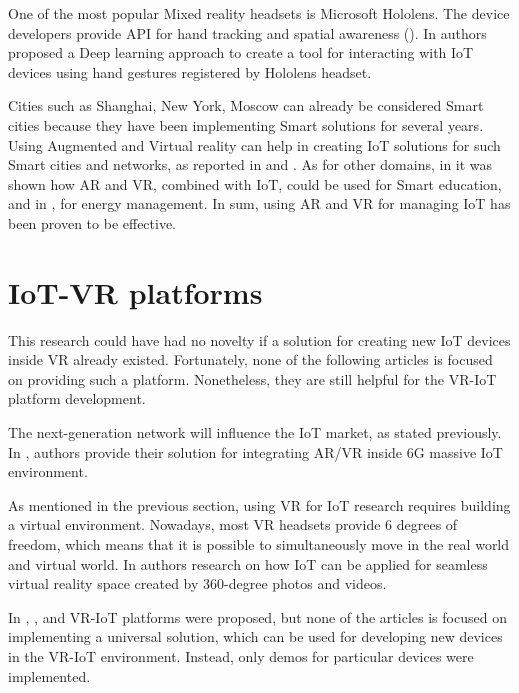 One of the most popular Mixed reality headsets is Microsoft Hololens. The device developers provide API for hand tracking and spatial awareness (\cite{MRTK2021}). In \cite{sun_magichand_2019} authors proposed a Deep learning approach to create a tool for interacting with IoT devices using hand gestures registered by Hololens headset. 

Cities such as Shanghai, New York, Moscow can already be considered Smart cities because they have been implementing Smart solutions for several years. Using Augmented and Virtual reality can help in creating IoT solutions for such Smart cities and networks, as reported in \cite{chakareski_uav-iot_2019} and \cite{carneiro_bim_2018}. As for other domains, in \cite{paul_role_2019} it was shown how AR and VR, combined with IoT, could be used for Smart education, and in \cite{jang_building_2019-1}, for energy management. In sum, using AR and VR for managing IoT has been proven to be effective.

\section{IoT-VR platforms}

This research could have had no novelty if a solution for creating new IoT devices inside VR already existed. Fortunately, none of the following articles is focused on providing such a platform. Nonetheless, they are still helpful for the VR-IoT platform development.

The next-generation network will influence the IoT market, as stated previously. In \cite{liao_information-centric_2021}, authors provide their solution for integrating AR/VR inside 6G massive IoT environment.

As mentioned in the previous section, using VR for IoT research requires building a virtual environment. Nowadays, most VR headsets provide 6 degrees of freedom, which means that it is possible to simultaneously move in the real world and virtual world. In \cite{you_internet_2018} authors research on how IoT can be applied for seamless virtual reality space created by 360-degree photos and videos.

In \cite{myeong-in_choi_design_2017}, \cite{simiscuka_synchronisation_2018}, \cite{simiscuka_real-virtual_2019} and \cite{krishnan_performance_2020} VR-IoT platforms were proposed, but none of the articles is focused on implementing a universal solution, which can be used for developing new devices in the VR-IoT environment. Instead, only demos for particular devices were implemented.


